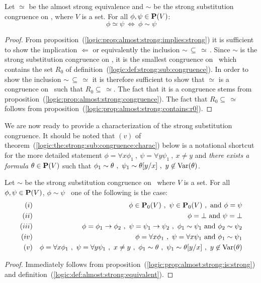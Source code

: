 \begin{prop}\label{logic:prop:almost:strong:is:strong}
Let $\simeq$ be the almost strong equivalence and $\sim$ be the
strong substitution congruence on \pv, where $V$ is a set. For all
$\phi,\psi\in\mbox{${\bf P}(V)$}$:
    \[
    \phi\simeq\psi\ \Leftrightarrow\ \phi\sim\psi
    \]
\end{prop}
\begin{proof}
From proposition~(\ref{logic:prop:almost:strong:implies:strong}) it
is sufficient to show the implication $\Leftarrow$ or equivalently
the inclusion $\sim\,\subseteq\,\simeq\,$. Since $\sim$ is the
strong substitution congruence on \pv, it is the smallest congruence
on \pv\ which contains the set $R_{0}$ of
definition~(\ref{logic:def:strong:sub:congruence}). In order to show
the inclusion $\sim\,\subseteq\,\simeq$ it is therefore sufficient
to show that $\simeq$ is a congruence on \pv\ such that
$R_{0}\subseteq\,\simeq$. The fact that it is a congruence stems
from proposition~(\ref{logic:prop:almost:strong:congruence}). The
fact that $R_{0}\subseteq\,\simeq$ follows from
proposition~(\ref{logic:prop:almost:strong:contains:r0}).
\end{proof}

We are now ready to provide a characterization of the strong
substitution congruence. It should be noted that $(v)$ of
theorem~(\ref{logic:the:strong:sub:congruence:charac}) below is a
notational shortcut for the more detailed statement $\phi=\forall
x\phi_{1}\ ,\ \psi=\forall y\psi_{1}\ ,\ x\neq y$ and {\em there
exists a formula} $\theta\in\mbox{${\bf P}(V)$}$ such that $\phi_{1}\sim \theta\ ,\
\psi_{1}\sim \theta[y/x]\ ,\ y\not\in\mbox{\rm Var}(\theta)$.
\begin{theorem}\label{logic:the:strong:sub:congruence:charac}
Let $\sim$ be the strong substitution congruence on \pv\ where $V$
is a set. For all $\phi,\psi\in\mbox{${\bf P}(V)$}$, $\phi\sim\psi$ \ifand\ one of
the following is the case:
    \begin{eqnarray*}
    (i)&&\phi\in\pvo\ ,\ \psi\in\pvo\ ,\ \mbox{and}\ \phi=\psi\\
    (ii)&&\phi=\bot\ \mbox{and}\ \psi=\bot\\
    (iii)&&\phi=\phi_{1}\to\phi_{2}\ ,\ \psi=\psi_{1}\to\psi_{2}\ ,\
    \phi_{1}\sim\psi_{1}\ \mbox{and}\ \phi_{2}\sim\psi_{2}\\
    (iv)&&\phi=\forall x\phi_{1}\ ,\ \psi=\forall x\psi_{1}\ \mbox{and}\ \phi_{1}\sim\psi_{1}\\
    (v)&&\phi=\forall x\phi_{1}\ ,\ \psi=\forall y\psi_{1}\ ,\ x\neq y\ ,\
    \phi_{1}\sim \theta\ ,\ \psi_{1}\sim \theta[y/x]\ ,\ y\not\in\var(\theta)
    \end{eqnarray*}
\end{theorem}
\begin{proof}
Immediately follows from
proposition~(\ref{logic:prop:almost:strong:is:strong}) and
definition~(\ref{logic:def:almost:strong:equivalent}).
\end{proof}

